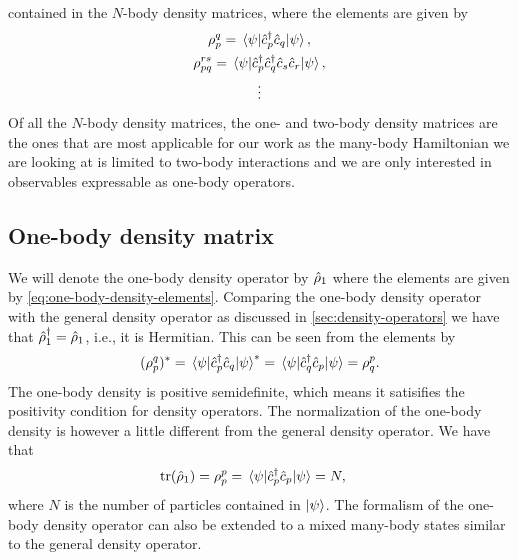         contained in the $N$-body density matrices, where the elements are given
        by
        \begin{gather}
            \rho^{q}_{p}
            = \mel{\psi}{\hat{c}_{p}^{\dagger}\hat{c}_{q}}{\psi},
            \label{eq:one-body-density-elements}
            \\
            \rho^{rs}_{pq}
            = \mel{\psi}{\hat{c}_{p}^{\dagger}\hat{c}_{q}^{\dagger}\hat{c}_{s}\hat{c}_{r}}{\psi},
            \label{eq:two-body-density-elements}
            \\
            \vdots
        \end{gather}
        Of all the $N$-body density matrices, the one- and two-body density
        matrices are the ones that are most applicable for our work as the
        many-body Hamiltonian we are looking at is limited to two-body
        interactions and we are only interested in observables expressable as
        one-body operators.

        \subsection{One-body density matrix}
            We will denote the one-body density operator by $\hat{\rho}_1$ where
            the elements are given by \autoref{eq:one-body-density-elements}.
            Comparing the one-body density operator with the general density
            operator as discussed in \autoref{sec:density-operators} we have
            that $\hat{\rho}^{\dagger}_1 = \hat{\rho}_1$, i.e., it is Hermitian.
            This can be seen from the elements by
            \begin{align}
                (\rho^{q}_{p})^{*}
                = \mel{\psi}{\hat{c}_{p}^{\dagger}\hat{c}_{q}}{\psi}^{*}
                = \mel{\psi}{\hat{c}_{q}^{\dagger}\hat{c}_{p}}{\psi}
                = \rho^{p}_{q}.
            \end{align}
            The one-body density is positive semidefinite, which means it
            satisifies the positivity condition for density operators.
            The normalization of the one-body density is however a little
            different from the general density operator.
            We have that
            \begin{align}
                \tr(\hat{\rho}_1)
                &= \rho^{p}_{p}
                = \mel{\psi}{\hat{c}_{p}^{\dagger}\hat{c}_{p}}{\psi}
                = N,
            \end{align}
            where $N$ is the number of particles contained in $\ket{\psi}$.
            The formalism of the one-body density operator can also be extended
            to a mixed many-body states similar to the general density operator.

